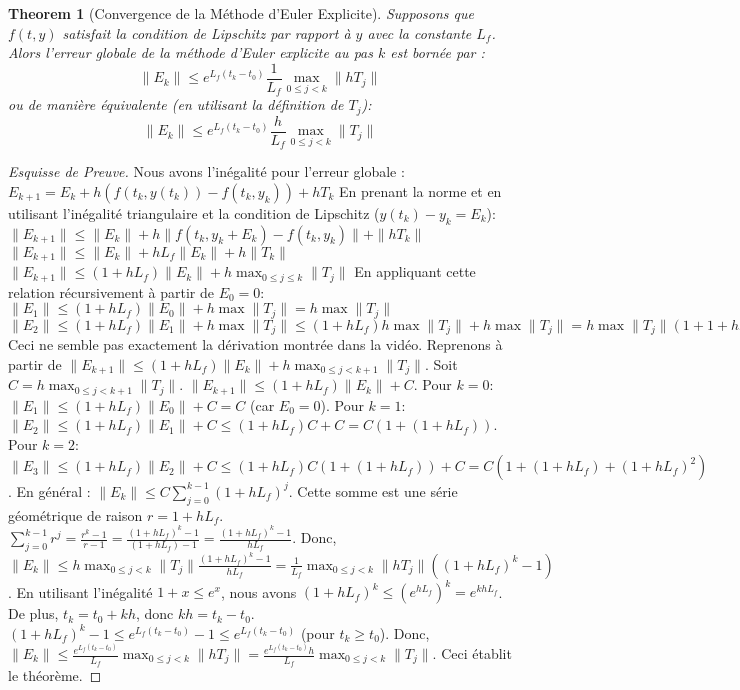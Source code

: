 \documentclass{article}
\newtheorem{theorem}{Theorem}
\begin{document}
\begin{theorem}[Convergence de la Méthode d'Euler Explicite]
Supposons que $f(t, y)$ satisfait la condition de Lipschitz par rapport à $y$ avec la constante $L_f$. Alors l'erreur globale de la méthode d'Euler explicite au pas $k$ est bornée par :
\[ \|E_k\| \le e^{L_f(t_k - t_0)} \frac{1}{L_f} \max_{0 \le j < k} \|h T_j\| \]
ou de manière équivalente (en utilisant la définition de $T_j$):
\[ \|E_k\| \le e^{L_f(t_k - t_0)} \frac{h}{L_f} \max_{0 \le j < k} \|T_j\| \]
\end{theorem}

\begin{proof}[Esquisse de Preuve]
Nous avons l'inégalité pour l'erreur globale :
$E_{k+1} = E_k + h (f(t_k, y(t_k)) - f(t_k, y_k)) + h T_k$
En prenant la norme et en utilisant l'inégalité triangulaire et la condition de Lipschitz ($y(t_k) - y_k = E_k$):
$\|E_{k+1}\| \le \|E_k\| + h \|f(t_k, y_k + E_k) - f(t_k, y_k)\| + \|h T_k\|$
$\|E_{k+1}\| \le \|E_k\| + h L_f \|E_k\| + h \|T_k\|$
$\|E_{k+1}\| \le (1 + h L_f) \|E_k\| + h \max_{0 \le j \le k} \|T_j\|$
En appliquant cette relation récursivement à partir de $E_0 = 0$:
$\|E_1\| \le (1 + h L_f) \|E_0\| + h \max \|T_j\| = h \max \|T_j\|$
$\|E_2\| \le (1 + h L_f) \|E_1\| + h \max \|T_j\| \le (1 + h L_f) h \max \|T_j\| + h \max \|T_j\| = h \max \|T_j\| (1 + 1 + h L_f)$
Ceci ne semble pas exactement la dérivation montrée dans la vidéo. Reprenons à partir de $\|E_{k+1}\| \le (1 + h L_f) \|E_k\| + h \max_{0 \le j < k+1} \|T_j\|$. Soit $C = h \max_{0 \le j < k+1} \|T_j\|$.
$\|E_{k+1}\| \le (1 + h L_f) \|E_k\| + C$.
Pour $k=0$: $\|E_1\| \le (1 + h L_f) \|E_0\| + C = C$ (car $E_0=0$).
Pour $k=1$: $\|E_2\| \le (1 + h L_f) \|E_1\| + C \le (1 + h L_f) C + C = C (1 + (1+hL_f))$.
Pour $k=2$: $\|E_3\| \le (1 + h L_f) \|E_2\| + C \le (1 + h L_f) C (1 + (1+hL_f)) + C = C (1 + (1+hL_f) + (1+hL_f)^2)$.
En général : $\|E_k\| \le C \sum_{j=0}^{k-1} (1 + h L_f)^j$.
Cette somme est une série géométrique de raison $r = 1 + h L_f$.
$\sum_{j=0}^{k-1} r^j = \frac{r^k - 1}{r - 1} = \frac{(1 + h L_f)^k - 1}{(1 + h L_f) - 1} = \frac{(1 + h L_f)^k - 1}{h L_f}$.
Donc, $\|E_k\| \le h \max_{0 \le j < k} \|T_j\| \frac{(1 + h L_f)^k - 1}{h L_f} = \frac{1}{L_f} \max_{0 \le j < k} \|h T_j\| ((1 + h L_f)^k - 1)$.
En utilisant l'inégalité $1+x \le e^x$, nous avons $(1+hL_f)^k \le (e^{hL_f})^k = e^{khL_f}$. De plus, $t_k = t_0 + kh$, donc $kh = t_k - t_0$.
$(1 + h L_f)^k - 1 \le e^{L_f(t_k - t_0)} - 1 \le e^{L_f(t_k - t_0)}$ (pour $t_k \ge t_0$).
Donc, $\|E_k\| \le \frac{e^{L_f(t_k - t_0)}}{L_f} \max_{0 \le j < k} \|h T_j\| = \frac{e^{L_f(t_k - t_0)} h}{L_f} \max_{0 \le j < k} \|T_j\|$.
Ceci établit le théorème.
\end{proof}
\end{document}
